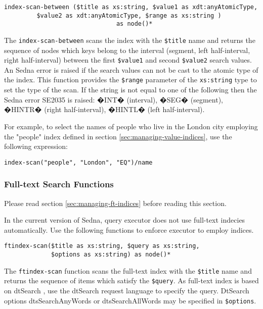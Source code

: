 \documentclass[a4paper,12pt]{article}
\begin{document}
\begin{verbatim}
index-scan-between ($title as xs:string, $value1 as xdt:anyAtomicType,
         $value2 as xdt:anyAtomicType, $range as xs:string )
                               as node()*
\end{verbatim}

The \verb!index-scan-between! scans the index with the \verb!$title! name and returns the sequence of nodes which keys belong to the interval (segment, left half-interval, right half-interval) between the first \verb!$value1! and second \verb!$value2! search values. An Sedna error is raised if the search values can not be cast to the atomic type of the index. This function provides the \verb!$range! parameter of the \verb!xs:string! type to set the type of the scan. If the string is not equal to one of the following then the Sedna error SE2035 is raised: �INT� (interval), �SEG� (segment), �HINTR� (right half-interval), �HINTL� (left half-interval).

For example, to select the names of people who live in the London city employing the "people" index defined in section \ref{sec:managing-value-indices}, use the following expression:
\begin{verbatim}
index-scan("people", "London", "EQ")/name
\end{verbatim}




\subsubsection{Full-text Search Functions}
\label{sec:ft-fun}
Please read section \ref{sec:managing-ft-indices} before reading this section.

In the current version of Sedna, query executor does not use full-text indecies automatically. Use the following functions
to enforce executor to employ indices.

\begin{verbatim}
ftindex-scan($title as xs:string, $query as xs:string,
             $options as xs:string) as node()*
\end{verbatim}

The \verb!ftindex-scan! function scans the full-text index with the \verb!$title! name and returns the sequence of items which satisfy the \verb!$query!. As full-text index is based on dtSearch \cite{link:dtsearch-engine}, use the dtSearch request language \cite{doc:dtsearch} to specify the query.
DtSearch options dtsSearchAnyWords or dtsSearchAllWords may be specified in \verb!$options!.
\end{document}

